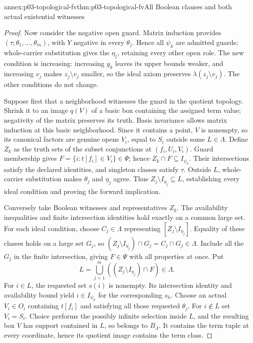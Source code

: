 \begin{annexitem}{annex:p03-topological-fv}{thm:p03-topological-fv}{All Boolean clauses and both actual existential witnesses}
\begin{proof}
Now consider the negative open guard. Matrix induction provides
\((\tau;\theta_1,\ldots,\theta_m)\), with \(Y\) negative in
every \(\theta_j\). Hence all \(\psi_k\) are admitted guards;
whole-carrier substitution gives the \(\eta_j\), retaining every other
open role. The new condition is increasing: increasing \(y_k\) leaves
its upper bounds weaker, and increasing \(v_j\) makes
\(z_j\setminus v_j\) smaller, so the ideal axiom preserves
\(\lambda(z_j\setminus v_j)\). The other conditions do not change.

Suppose first that a neighborhood witnesses the guard in the quotient
topology. Shrink it to an image \(q(V)\) of a basic box containing the
assigned term value; negativity of the matrix preserves its truth.
Basis invariance allows matrix induction at this basic neighborhood.
Since it contains a point, \(V\) is nonempty, so its canonical factors
are genuine opens \(V_i\), equal to \(S_i\) outside some
\(L\in\Lambda\). Define \(Z_k\) as the truth sets of the subset
conjunctions at \((f_i,U_i,V_i)\). Guard membership gives
\(F=\{i:t[f_i]\in V_i\}\in\Psi\); hence
\(Z_k\cap F\subseteq I_{\psi_k}\). Their intersections satisfy
the declared identities, and singleton classes satisfy \(\tau\).
Outside \(L\), whole-carrier substitution makes
\(\theta_j\) and \(\eta_j\) agree. Thus
\(Z_j\setminus I_{\eta_j}\subseteq L\), establishing every
ideal condition and proving the forward implication.

Conversely take Boolean witnesses and representatives \(Z_k\).
The availability inequalities and finite intersection identities hold
exactly on a common large set. For each ideal condition, choose
\(C_j\in\Lambda\) representing
\([Z_j\setminus I_{\eta_j}]\). Equality of these classes holds
on a large set \(G_j\), so
\((Z_j\setminus I_{\eta_j})\cap G_j=C_j\cap G_j\in\Lambda\).
Include all the \(G_j\) in the finite intersection, giving \(F\in\Psi\)
with all properties at once. Put
\[
                    L=\bigcup_{j=1}^m
                       ((Z_j\setminus I_{\eta_j})\cap F)\in\Lambda.
\]
For \(i\in L\), the requested set \(s(i)\) is nonempty.
Its intersection identity and availability bound yield
\(i\in I_{\psi_h}\) for the corresponding \(s_h\).
Choose an actual \(V_i\in O_i\) containing \(t[f_i]\) and
satisfying all those requested \(\theta_j\). For \(i\notin L\)
set \(V_i=S_i\). Choice performs the possibly infinite selection
inside \(L\), and the resulting box \(V\) has support contained
in \(L\), so belongs to \(B_\Lambda\). It contains the term
tuple at every coordinate, hence its quotient image contains the term class.


\end{proof}
\end{annexitem}
